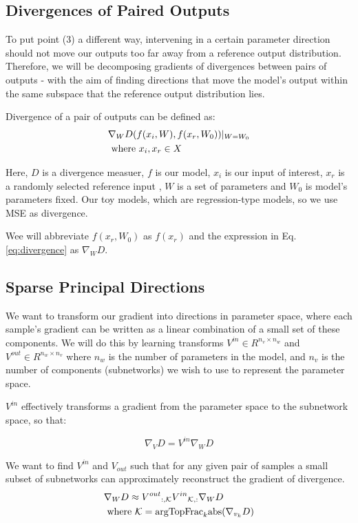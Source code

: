 \documentclass{article}
\theoremstyle{plain}
\theoremstyle{definition}
\theoremstyle{remark}
\begin{document}
\subsection{Divergences of Paired Outputs}\label{sec:criteria}
To put point (3) a different way, intervening in a certain parameter direction should not move our outputs too far away from a reference output distribution. Therefore, we will be decomposing gradients of divergences between pairs of outputs - with the aim of finding directions that move the model's output within the same subspace that the reference output distribution lies. 

Divergence of a pair of outputs can be defined as:
\begin{align}\label{eq:divergence}
    &\nabla_W D(f(x_i, W), f(x_r, W_0))|_{W=W_0} \\
    &\text{ where } x_i, x_r \in X \notag
\end{align}


Here, $D$ is a divergence measuer, $f$ is our model, $x_i$ is our input of interest, $x_r$ is a randomly selected reference input , $W$ is a set of parameters and $W_0$ is model's parameters fixed. Our toy models, which are regression-type models, so we use MSE as divergence.

Wee will abbreviate $f(x_r, W_0)$ as $f(x_r)$ and the expression in Eq. \ref{eq:divergence} as $\nabla_W D$.

\subsection{Sparse Principal Directions}\label{sec:decomposition}

We want to transform our gradient into directions in parameter space, where each sample's gradient can be written as a linear combination of a small set of these components. We will do this by learning transforms $V^{in} \in R^{n_v \times n_w}$ and $V^{out} \in R^{n_w \times n_v}$ where $n_w$ is the number of parameters in the model, and $n_v$ is the number of components (subnetworks) we wish to use to represent the parameter space.

$V^{in}$ effectively transforms a gradient from the parameter space to the subnetwork space, so that: 

\begin{equation}
    \nabla_V D = V^{in} \nabla_W D
\end{equation}

We want to find $V^{in}$ and $V_{out}$ such that for any given pair of samples a small subset of subnetworks can approximately reconstruct the gradient of divergence. 
\begin{align}
    & \nabla_W D \approx {V^{out}}_{:, \mathcal{K}} {V^{in}}_{\mathcal{K},:} \nabla_W D \\
    & \text{ where } \mathcal{K}   = \text{argTopFrac}_k \text{abs}(\nabla_{v_k} D) \notag
\end{align}
\end{document}
